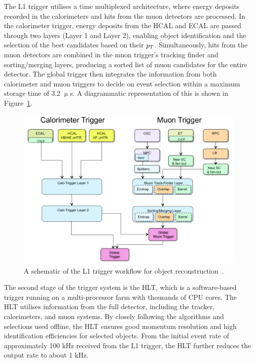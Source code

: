 The \ac{L1} trigger utilises a time multiplexed architecture, where energy deposits recorded in the calorimeters and hits from the muon detectors are processed. 
In the calorimeter trigger, energy deposits from the \ac{HCAL} and \ac{ECAL} are passed through two layers (Layer 1 and Layer 2), enabling object identification and the selection of the best candidates based on their $p_{T}$. 
Simultaneously, hits from the muon detectors are combined in the muon trigger's tracking finder and sorting/merging layers, producing a sorted list of muon candidates for the entire detector. 
The global trigger then integrates the information from both calorimeter and muon triggers to decide on event selection within a maximum storage time of 3.2 $\upmu$s.
A diagrammatic representation of this is shown in Figure~\ref{fig:trigger}. \\

\begin{figure}[!hbtp]
    \centering
    \includegraphics[width=\textwidth]{Figures/trigger.png}
    \caption{A schematic of the L1 trigger workflow for object reconstruction~\cite{Tapper:2013yva}.}
    \label{fig:trigger}
\end{figure}

The second stage of the trigger system is the \ac{HLT}, which is a software-based trigger running on a multi-processor farm with thousands of CPU cores. 
The \ac{HLT} utilises information from the full detector, including the tracker, calorimeters, and muon systems. 
By closely following the algorithms and selections used offline, the \ac{HLT} ensures good momentum resolution and high identification efficiencies for selected objects. 
From the initial event rate of approximately 100 kHz received from the \ac{L1} trigger, the \ac{HLT} further reduces the output rate to about 1 kHz. \\

